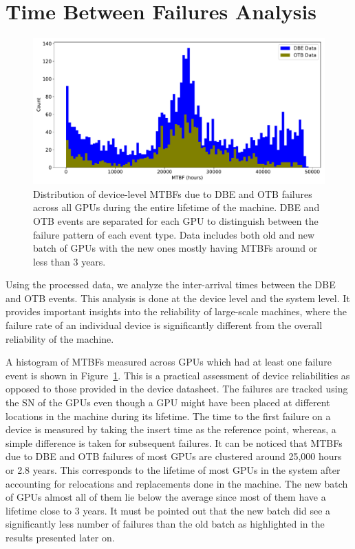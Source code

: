 \section{Time Between Failures Analysis}
\label{section:tbf}

\begin{figure}[bt]
  \begin{center}
    \includegraphics[width=\columnwidth]{figs/MTBF_GPUwise.pdf}
  \end{center}
  \caption{Distribution of device-level MTBFs due to DBE and OTB failures across all GPUs during the
entire lifetime of the machine. DBE and OTB events are separated for each GPU to distinguish between 
the failure pattern of each event type. Data includes both old and new batch of GPUs with the new ones 
mostly having MTBFs around or less than 3 years.}
  \label{fig:Device_MTBFs}
\end{figure}

Using the processed data, we analyze the inter-arrival times between the DBE and OTB events. 
This analysis is done at the device level and the system level. 
It provides important insights into the reliability of large-scale machines, where the 
failure rate of an individual device is significantly different from the overall reliability
of the machine.  

A histogram of MTBFs measured across GPUs which had at least one failure event is shown 
in Figure~\ref{fig:Device_MTBFs}. This is a practical assessment of device reliabilities 
as opposed to those provided in the device datasheet. The failures are tracked using the
SN of the GPUs even though a GPU might have been placed at different locations in the 
machine during its lifetime. The time to the first failure on a device is measured by taking
the insert time as the reference point, whereas, a simple difference is taken for subsequent
failures. It can be noticed that MTBFs due to DBE and OTB failures of most GPUs are clustered around 
25,000 hours or 2.8 years. This corresponds to the lifetime of most GPUs in the system after accounting 
for relocations and replacements done in the machine. The new batch of GPUs almost all of them lie below 
the average since most of them have a lifetime close to 3 years. It must be pointed out that the new batch did 
see a significantly less number of failures than the old batch as highlighted in the results presented later on.

